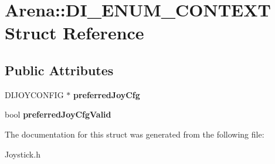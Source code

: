 \hypertarget{struct_arena_1_1_d_i___e_n_u_m___c_o_n_t_e_x_t}{\section{Arena\+:\+:D\+I\+\_\+\+E\+N\+U\+M\+\_\+\+C\+O\+N\+T\+E\+X\+T Struct Reference}
\label{struct_arena_1_1_d_i___e_n_u_m___c_o_n_t_e_x_t}
}
\subsection*{Public Attributes}
\begin{DoxyCompactItemize}
\item 
\hypertarget{struct_arena_1_1_d_i___e_n_u_m___c_o_n_t_e_x_t_ab6a8a18c9f0c3646ef56efd213eeb802}{D\+I\+J\+O\+Y\+C\+O\+N\+F\+I\+G $\ast$ {\bfseries preferred\+Joy\+Cfg}}\label{struct_arena_1_1_d_i___e_n_u_m___c_o_n_t_e_x_t_ab6a8a18c9f0c3646ef56efd213eeb802}

\item 
\hypertarget{struct_arena_1_1_d_i___e_n_u_m___c_o_n_t_e_x_t_a1905ec6cdd574038d12b5750d09fc284}{bool {\bfseries preferred\+Joy\+Cfg\+Valid}}\label{struct_arena_1_1_d_i___e_n_u_m___c_o_n_t_e_x_t_a1905ec6cdd574038d12b5750d09fc284}

\end{DoxyCompactItemize}


The documentation for this struct was generated from the following file\+:\begin{DoxyCompactItemize}
\item 
Joystick.\+h\end{DoxyCompactItemize}
